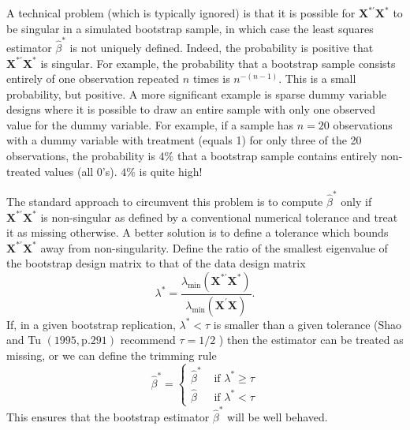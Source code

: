 \documentclass[10pt]{article}
\begin{document}
A technical problem (which is typically ignored) is that it is possible for $\boldsymbol{X}^{* \prime} \boldsymbol{X}^{*}$ to be singular in a simulated bootstrap sample, in which case the least squares estimator $\widehat{\beta}^{*}$ is not uniquely defined. Indeed, the probability is positive that $\boldsymbol{X}^{* \prime} \boldsymbol{X}^{*}$ is singular. For example, the probability that a bootstrap sample consists entirely of one observation repeated $n$ times is $n^{-(n-1)}$. This is a small probability, but positive. A more significant example is sparse dummy variable designs where it is possible to draw an entire sample with only one observed value for the dummy variable. For example, if a sample has $n=20$ observations with a dummy variable with treatment (equals 1) for only three of the 20 observations, the probability is $4 \%$ that a bootstrap sample contains entirely non-treated values (all 0's). $4 \%$ is quite high!

The standard approach to circumvent this problem is to compute $\widehat{\beta}^{*}$ only if $\boldsymbol{X}^{* \prime} \boldsymbol{X}^{*}$ is non-singular as defined by a conventional numerical tolerance and treat it as missing otherwise. A better solution is to define a tolerance which bounds $\boldsymbol{X}^{* \prime} \boldsymbol{X}^{*}$ away from non-singularity. Define the ratio of the smallest eigenvalue of the bootstrap design matrix to that of the data design matrix
$$
\lambda^{*}=\frac{\lambda_{\min }\left(\boldsymbol{X}^{* \prime} \boldsymbol{X}^{*}\right)}{\lambda_{\min }\left(\boldsymbol{X}^{\prime} \boldsymbol{X}\right)} .
$$
If, in a given bootstrap replication, $\lambda^{*}<\tau$ is smaller than a given tolerance (Shao and Tu $(1995, \mathrm{p} .291)$ recommend $\tau=1 / 2$ ) then the estimator can be treated as missing, or we can define the trimming rule
$$
\widehat{\beta}^{*}=\left\{\begin{array}{cc}
\widehat{\beta}^{*} & \text { if } \lambda^{*} \geq \tau \\
\widehat{\beta} & \text { if } \lambda^{*}<\tau
\end{array}\right.
$$
This ensures that the bootstrap estimator $\widehat{\beta}^{*}$ will be well behaved.
\end{document}
